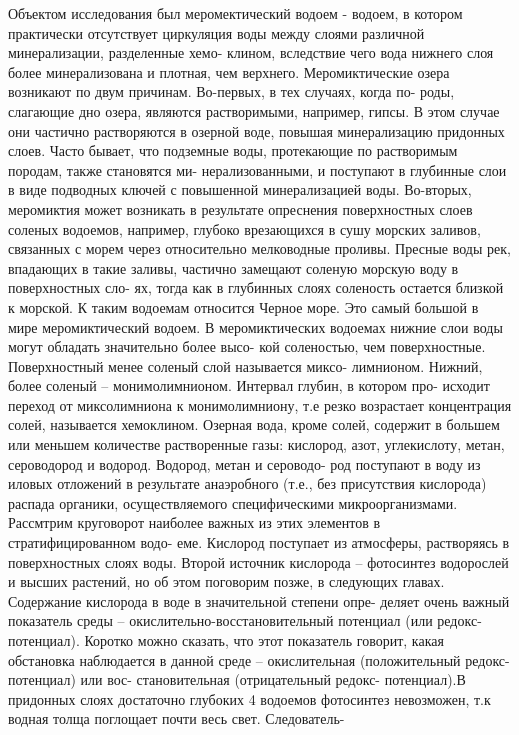 Объектом исследования был меромектический водоем - водоем, в котором практически
отсутствует циркуляция воды между слоями различной минерализации, разделенные хемо-
клином, вследствие чего вода нижнего слоя более минерализована и плотная, чем верхнего.
Меромиктические озера возникают по двум причинам. Во-первых, в тех случаях, когда по-
роды, слагающие дно озера, являются растворимыми, например, гипсы. В этом случае они
частично растворяются в озерной воде, повышая минерализацию придонных слоев. Часто
бывает, что подземные воды, протекающие по растворимым породам, также становятся ми-
нерализованными, и поступают в глубинные слои в виде подводных ключей с повышенной
минерализацией воды. Во-вторых, меромиктия может возникать в результате опреснения
поверхностных слоев соленых водоемов, например, глубоко врезающихся в сушу морских
заливов, связанных с морем через относительно мелководные проливы. Пресные воды рек,
впадающих в такие заливы, частично замещают соленую морскую воду в поверхностных сло-
ях, тогда как в глубинных слоях соленость остается близкой к морской. К таким водоемам
относится Черное море. Это самый большой в мире меромиктический водоем.
В меромиктических водоемах нижние слои воды могут обладать значительно более высо-
кой соленостью, чем поверхностные. Поверхностный менее соленый слой называется миксо-
лимнионом. Нижний, более соленый – монимолимнионом. Интервал глубин, в котором про-
исходит переход от миксолимниона к монимолимниону, т.е резко возрастает концентрация
солей, называется хемоклином.
Озерная вода, кроме солей, содержит в большем или меньшем количестве растворенные
газы: кислород, азот, углекислоту, метан, сероводород и водород. Водород, метан и сероводо-
род поступают в воду из иловых отложений в результате анаэробного (т.е., без присутствия
кислорода) распада органики, осуществляемого специфическими микроорганизмами.
Рассмтрим круговорот наиболее важных из этих элементов в стратифицированном водо-
еме. Кислород поступает из атмосферы, растворяясь в поверхностных слоях воды. Второй
источник кислорода – фотосинтез водорослей и высших растений, но об этом поговорим
позже, в следующих главах. Содержание кислорода в воде в значительной степени опре-
деляет очень важный показатель среды – окислительно-восстановительный потенциал (или
редокс-потенциал). Коротко можно сказать, что этот показатель говорит, какая обстановка
наблюдается в данной среде – окислительная (положительный редокс-потенциал) или вос-
становительная (отрицательный редокс- потенциал).В придонных слоях достаточно глубоких
4
водоемов фотосинтез невозможен, т.к водная толща поглощает почти весь свет. Следователь-
